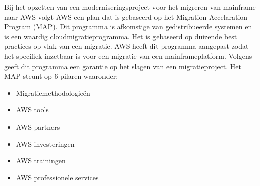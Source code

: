 Bij het opzetten van een moderniseringsproject voor het migreren van mainframe naar AWS volgt AWS een plan dat is gebaseerd op het Migration Accelaration Program (MAP). Dit programma is afkomstige van gedistribueerde systemen en is een waardig cloudmigratieprogramma. Het is gebaseerd op duizende best practices op vlak van een migratie. AWS heeft dit programma aangepast zodat het specifiek inzetbaar is voor een migratie van een mainframeplatform. Volgens \citeauthor{Valence2021} geeft dit programma een garantie op het slagen van een migratieproject. Het MAP steunt op 6 pilaren waaronder:
 \begin{itemize}
    \item Migratiemethodologieën
    \item AWS tools
    \item AWS partners
    \item AWS investeringen
    \item AWS trainingen
    \item AWS professionele services
\end{itemize}

\subsubsection{}
\label{sec:Het opzetten van een AWS Mainframe Modernisatie runtime omgeving}


